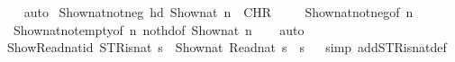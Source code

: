 \begin{isabellebody}
%
\isadelimproof
\ \ %
\endisadelimproof
%
\isatagproof
{}\isamarkupfalse%
\ auto%
\endisatagproof
{\isafoldproof}%
%
\isadelimproof
\isanewline
%
\endisadelimproof
\isanewline
{}\isamarkupfalse%
\ Show{\isacharunderscore}{\kern0pt}nat{\isacharunderscore}{\kern0pt}not{\isacharunderscore}{\kern0pt}neg{\isacharprime}{\kern0pt}{\isacharprime}{\kern0pt}{\isacharcolon}{\kern0pt}\ {\isacartoucheopen}hd\ {\isacharparenleft}{\kern0pt}Show\isactrlsub n\isactrlsub a\isactrlsub t\ n{\isacharparenright}{\kern0pt}\ {\isasymnoteq}\ {\isacharparenleft}{\kern0pt}CHR\ {\isacharprime}{\kern0pt}{\isacharprime}{\kern0pt}{\isacharminus}{\kern0pt}{\isacharprime}{\kern0pt}{\isacharprime}{\kern0pt}{\isacharparenright}{\kern0pt}{\isacartoucheclose}\isanewline
%
\isadelimproof
\ \ %
\endisadelimproof
%
\isatagproof
{}\isamarkupfalse%
\ Show{\isacharunderscore}{\kern0pt}nat{\isacharunderscore}{\kern0pt}not{\isacharunderscore}{\kern0pt}neg{\isacharbrackleft}{\kern0pt}of\ {\isacartoucheopen}n{\isacartoucheclose}{\isacharbrackright}{\kern0pt}\isanewline
\ \ Show{\isacharunderscore}{\kern0pt}nat{\isacharunderscore}{\kern0pt}not{\isacharunderscore}{\kern0pt}empty{\isacharbrackleft}{\kern0pt}of\ {\isacartoucheopen}n{\isacartoucheclose}{\isacharbrackright}{\kern0pt}\ not{\isacharunderscore}{\kern0pt}hd{\isacharbrackleft}{\kern0pt}of\ {\isacartoucheopen}Show\isactrlsub n\isactrlsub a\isactrlsub t\ n{\isacartoucheclose}{\isacharbrackright}{\kern0pt}\isanewline
\ \ \isamarkupfalse%
\ auto%
\endisatagproof
{\isafoldproof}%
%
\isadelimproof
\isanewline
%
\endisadelimproof
\isanewline
{}\isamarkupfalse%
\ Show{\isacharunderscore}{\kern0pt}Read{\isacharunderscore}{\kern0pt}nat{\isacharunderscore}{\kern0pt}id{\isacharcolon}{\kern0pt}\ {\isacartoucheopen}STR{\isacharunderscore}{\kern0pt}is{\isacharunderscore}{\kern0pt}nat\ s\ {\isasymLongrightarrow}\ {\isacharparenleft}{\kern0pt}Show\isactrlsub n\isactrlsub a\isactrlsub t\ {\isacharparenleft}{\kern0pt}Read\isactrlsub n\isactrlsub a\isactrlsub t\ s{\isacharparenright}{\kern0pt}\ {\isacharequal}{\kern0pt}\ s{\isacharparenright}{\kern0pt}{\isacartoucheclose}\isanewline
%
\isadelimproof
\ \ %
\endisadelimproof
%
\isatagproof
{}\isamarkupfalse%
{\isacharparenleft}{\kern0pt}simp\ add{\isacharcolon}{\kern0pt}STR{\isacharunderscore}{\kern0pt}is{\isacharunderscore}{\kern0pt}nat{\isacharunderscore}{\kern0pt}def{\isacharparenright}{\kern0pt}%
\endisatagproof
{\isafoldproof}%
%
\isadelimproof
\isanewline
%
\endisadelimproof
\isanewline
{}\isamarkupfalse%

\end{isabellebody}
